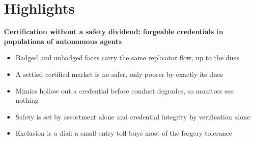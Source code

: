 \documentclass[11pt,a4paper]{article}
\begin{document}
\section*{Highlights}

\noindent\textbf{Certification without a safety dividend: forgeable credentials
in populations of autonomous agents}

\medskip

\begin{itemize}
\item Badged and unbadged faces carry the same replicator flow, up to the dues
\item A settled certified market is no safer, only poorer by exactly its dues
\item Mimics hollow out a credential before conduct degrades, so monitors see nothing
\item Safety is set by assortment alone and credential integrity by verification alone
\item Exclusion is a dial: a small entry toll buys most of the forgery tolerance
\end{itemize}
\end{document}
